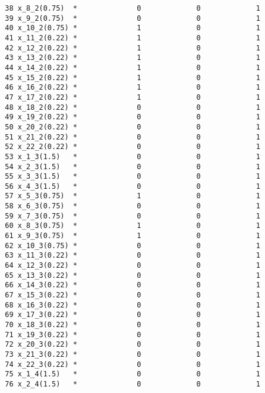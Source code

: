 \documentclass{article}[A4]
\begin{document}
\begin{verbatim}
	    38 x_8_2(0.75)  *              0             0             1 
	    39 x_9_2(0.75)  *              0             0             1 
	    40 x_10_2(0.75) *              1             0             1 
	    41 x_11_2(0.22) *              1             0             1 
	    42 x_12_2(0.22) *              1             0             1 
	    43 x_13_2(0.22) *              1             0             1 
	    44 x_14_2(0.22) *              1             0             1 
	    45 x_15_2(0.22) *              1             0             1 
	    46 x_16_2(0.22) *              1             0             1 
	    47 x_17_2(0.22) *              1             0             1 
	    48 x_18_2(0.22) *              0             0             1 
	    49 x_19_2(0.22) *              0             0             1 
	    50 x_20_2(0.22) *              0             0             1 
	    51 x_21_2(0.22) *              0             0             1 
	    52 x_22_2(0.22) *              0             0             1 
	    53 x_1_3(1.5)   *              0             0             1 
	    54 x_2_3(1.5)   *              0             0             1 
	    55 x_3_3(1.5)   *              0             0             1 
	    56 x_4_3(1.5)   *              0             0             1 
	    57 x_5_3(0.75)  *              1             0             1 
	    58 x_6_3(0.75)  *              0             0             1 
	    59 x_7_3(0.75)  *              0             0             1 
	    60 x_8_3(0.75)  *              1             0             1 
	    61 x_9_3(0.75)  *              1             0             1 
	    62 x_10_3(0.75) *              0             0             1 
	    63 x_11_3(0.22) *              0             0             1 
	    64 x_12_3(0.22) *              0             0             1 
	    65 x_13_3(0.22) *              0             0             1 
	    66 x_14_3(0.22) *              0             0             1 
	    67 x_15_3(0.22) *              0             0             1 
	    68 x_16_3(0.22) *              0             0             1 
	    69 x_17_3(0.22) *              0             0             1 
	    70 x_18_3(0.22) *              0             0             1 
	    71 x_19_3(0.22) *              0             0             1 
	    72 x_20_3(0.22) *              0             0             1 
	    73 x_21_3(0.22) *              0             0             1 
	    74 x_22_3(0.22) *              0             0             1 
	    75 x_1_4(1.5)   *              0             0             1 
	    76 x_2_4(1.5)   *              0             0             1 

\end{verbatim}
\end{document}
